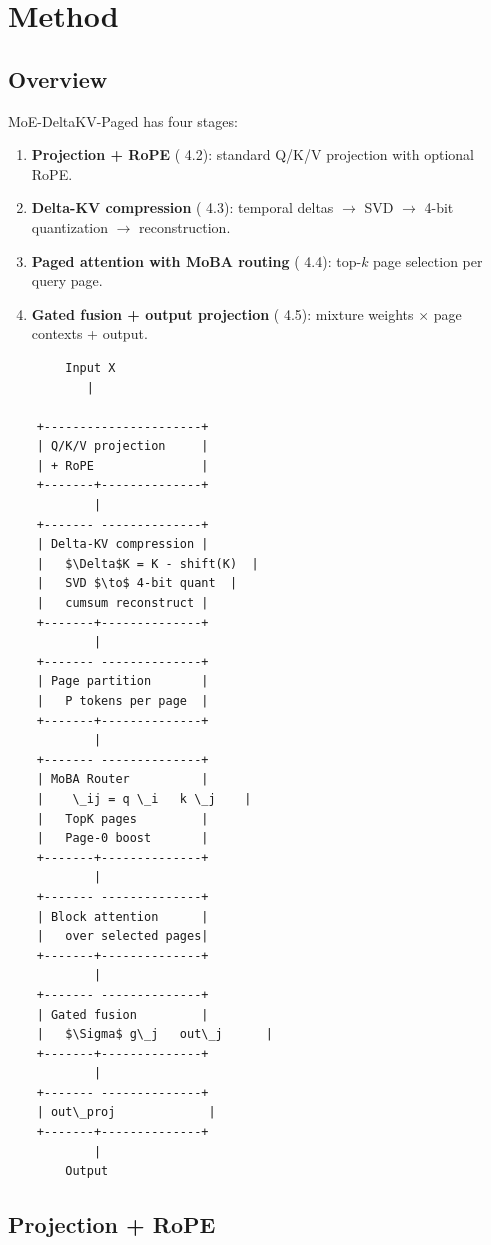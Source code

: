 \section{Method}

\subsection{Overview}

MoE-DeltaKV-Paged has four stages:

\begin{enumerate}
\item \textbf{Projection + RoPE} ( 4.2): standard Q/K/V projection with optional RoPE.
\item \textbf{Delta-KV compression} ( 4.3): temporal deltas $\to$ SVD $\to$ 4-bit quantization $\to$ reconstruction.
\item \textbf{Paged attention with MoBA routing} ( 4.4): top-$k$ page selection per query page.
\item \textbf{Gated fusion + output projection} ( 4.5): mixture weights $\times$ page contexts + output.

\end{enumerate}
\begin{lstlisting}
        Input X
           |
            
    +----------------------+
    | Q/K/V projection     |
    | + RoPE               |
    +-------+--------------+
            |
    +------- --------------+
    | Delta-KV compression |
    |   $\Delta$K = K - shift(K)  |
    |   SVD $\to$ 4-bit quant  |
    |   cumsum reconstruct |
    +-------+--------------+
            |
    +------- --------------+
    | Page partition       |
    |   P tokens per page  |
    +-------+--------------+
            |
    +------- --------------+
    | MoBA Router          |
    |    \_ij = q \_i   k \_j    |
    |   TopK pages         |
    |   Page-0 boost       |
    +-------+--------------+
            |
    +------- --------------+
    | Block attention      |
    |   over selected pages|
    +-------+--------------+
            |
    +------- --------------+
    | Gated fusion         |
    |   $\Sigma$ g\_j   out\_j      |
    +-------+--------------+
            |
    +------- --------------+
    | out\_proj             |
    +-------+--------------+
            |
        Output
\end{lstlisting}

\subsection{Projection + RoPE}


